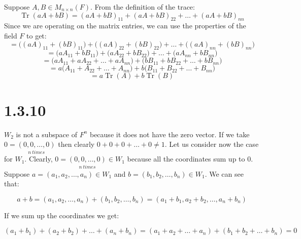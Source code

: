 \documentclass{article}
\DeclareMathOperator{\Tr}{Tr}
\begin{document}
Suppose \(A, B \in M_{n \times n}(F)\). From the definition of the trace:
\begin{equation*}
    \Tr(aA + bB) = (aA + bB)_{11} + (aA + bB)_{22} + \dots + (aA + bB)_{nn}
\end{equation*}
Since we are operating on the matrix entries, we can use the properties of the field \(F\) to get:
\begin{equation*}
    = \Big( (aA)_{11} + (bB)_{11} \Big) + \Big( (aA)_{22} + (bB)_{22} \Big) + \dots + \Big( (aA)_{nn} + (bB)_{nn} \Big)
\end{equation*}
\begin{equation*}
    = \Big( aA_{11} + bB_{11} \Big) + \Big( aA_{22} + bB_{22} \Big) + \dots + \Big( aA_{nn} + bB_{nn} \Big)
\end{equation*}
\begin{equation*}
    = \Big( aA_{11} + aA_{22} + \dots + aA_{nn} \Big) + \Big( bB_{11} + bB_{22} + \dots + bB_{nn} \Big)
\end{equation*}
\begin{equation*}
    = a\Big( A_{11} + A_{22} + \dots + A_{nn} \Big) + b\Big( B_{11} + B_{22} + \dots + B_{nn} \Big)
\end{equation*}
\begin{equation*}
    = a \Tr(A) + b \Tr(B)
\end{equation*}


\section*{1.3.10}
\(W_{2}\) is not a subspace of \(F^{n}\) because it does not have the zero vector. If we take
\(0 = \underset{n \ times}{(0, 0, \dots, 0)}\) then clearly \(0 + 0 + 0 + \dots + 0 \neq 1\). Let us consider now the case for \(W_{1}\).
Clearly, \(0 = \underset{n \ times}{(0, 0, \dots, 0)}  \in W_{1}\) because all the coordinates sum up to \(0\). Suppose \(a = (a_{1}, a_{2}, \dots, a_{n}) \in W_{1}\)
and \(b = (b_{1}, b_{2}, \dots, b_{n}) \in W_{1}\). We can see that:

\begin{equation*}
    a + b = (a_{1}, a_{2}, \dots, a_{n}) + (b_{1}, b_{2}, \dots, b_{n}) = (a_{1} + b_{1}, a_{2} + b_{2}, \dots, a_{n} + b_{n}) 
\end{equation*}

If we sum up the coordinates we get:

\begin{equation*}
    (a_{1} + b_{1}) + (a_{2} + b_{2}) + \dots + (a_{n} + b_{n}) = (a_{1} + a_{2} + \dots + a_{n}) + (b_{1} + b_{2} + \dots + b_{n}) = 0
\end{equation*}
\end{document}
